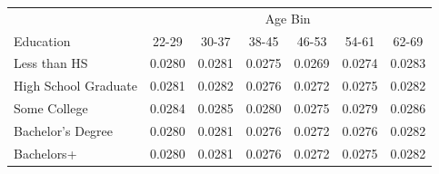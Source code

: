 \begin{tabular}{lcccccc}
\hline\hline
 & \multicolumn{6}{c}{Age Bin} \\
Education & 22-29 & 30-37 & 38-45 & 46-53 & 54-61 & 62-69 \\
\hline
Less than HS&0.0280&0.0281&0.0275&0.0269&0.0274&0.0283\\
High School Graduate&0.0281&0.0282&0.0276&0.0272&0.0275&0.0282\\
Some College&0.0284&0.0285&0.0280&0.0275&0.0279&0.0286\\
Bachelor's Degree&0.0280&0.0281&0.0276&0.0272&0.0276&0.0282\\
Bachelors+&0.0280&0.0281&0.0276&0.0272&0.0275&0.0282\\
\hline\hline
\end{tabular}
